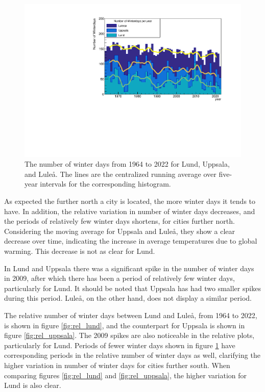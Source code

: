 \documentclass[aps,prl,groupedaddress,twocolumn]{revtex4-1}
\begin{document}
\begin{figure}[h!]
    \includegraphics[scale=0.5,trim=0.5cm 0.3cm 0.5cm 1cm,clip]{winterday_hist.pdf}
    \vspace{-0.6cm}
    \caption{The number of winter days from 1964 to 2022 for Lund, Uppsala, and Luleå. The lines are the centralized running average over five-year intervals for the corresponding histogram.}
    \label{fig:winterdays}
\end{figure}

As expected the further north a city is located, the more winter days it tends to have. In addition, the relative variation in number of winter days decreases, and the periods of relatively few winter days shortens, for cities further north. Considering the moving average for Uppsala and Luleå, they show a clear decrease over time, indicating the increase in average temperatures due to global warming. This decrease is not as clear for Lund.

In Lund and Uppsala there was a significant spike in the number of winter days in 2009, after which there has been a period of relatively few winter days, particularly for Lund. It should be noted that Uppsala has had two smaller spikes during this period. Luleå, on the other hand, does not display a similar period. 

The relative number of winter days between Lund and Luleå, from 1964 to 2022, is shown in figure \ref{fig:rel_lund}, and the counterpart for Uppsala is shown in figure \ref{fig:rel_uppsala}. The 2009 spikes are also noticeable in the relative plots, particularly for Lund. Periods of fewer winter days shown in figure \ref{fig:winterdays} have corresponding periods in the relative number of winter days as well, clarifying the higher variation in number of winter days for cities further south. When comparing figures \ref{fig:rel_lund}
and \ref{fig:rel_uppsala}, the higher variation for Lund is also clear.
\vspace{-0.3cm}
\end{document}

